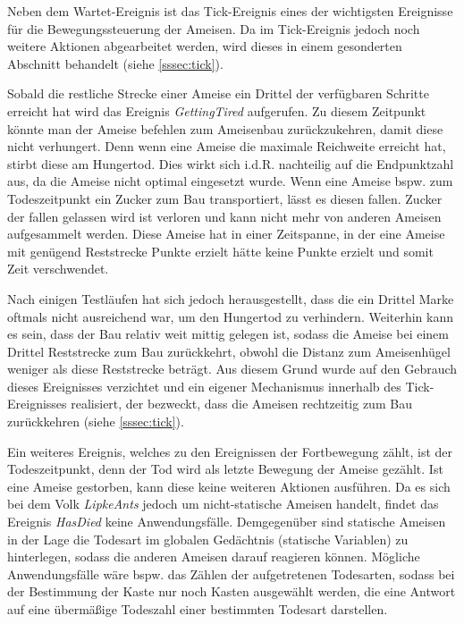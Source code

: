 
Neben dem Wartet-Ereignis ist das Tick-Ereignis eines der wichtigsten Ereignisse für die Bewegungssteuerung der Ameisen. Da im Tick-Ereignis jedoch noch weitere Aktionen abgearbeitet werden, wird dieses in einem gesonderten Abschnitt behandelt (siehe \ref{sssec:tick}).


Sobald die restliche Strecke einer Ameise ein Drittel der verfügbaren Schritte erreicht hat wird das Ereignis \textit{GettingTired} aufgerufen. Zu diesem Zeitpunkt könnte man der Ameise befehlen zum Ameisenbau zurückzukehren, damit diese nicht verhungert. Denn wenn eine Ameise die maximale Reichweite erreicht hat, stirbt diese am Hungertod. Dies wirkt sich i.d.R. nachteilig auf die Endpunktzahl aus, da die Ameise nicht optimal eingesetzt wurde. Wenn eine Ameise bspw. zum Todeszeitpunkt ein Zucker zum Bau transportiert, lässt es diesen fallen. Zucker der fallen gelassen wird ist verloren und kann nicht mehr von anderen Ameisen aufgesammelt werden. Diese Ameise hat in einer Zeitspanne, in der eine Ameise mit genügend Reststrecke Punkte erzielt hätte keine Punkte erzielt und somit Zeit verschwendet. 

Nach einigen Testläufen hat sich jedoch herausgestellt, dass die ein Drittel Marke oftmals nicht ausreichend war, um den Hungertod zu verhindern. Weiterhin kann es sein, dass der Bau relativ weit mittig gelegen ist, sodass die Ameise bei einem Drittel Reststrecke zum Bau zurückkehrt, obwohl die Distanz zum Ameisenhügel weniger als diese Reststrecke beträgt. Aus diesem Grund wurde auf den Gebrauch dieses Ereignisses verzichtet und ein eigener Mechanismus innerhalb des Tick-Ereignisses realisiert, der bezweckt, dass die Ameisen rechtzeitig zum Bau zurückkehren (siehe \ref{sssec:tick}).


Ein weiteres Ereignis, welches zu den Ereignissen der Fortbewegung zählt, ist der Todeszeitpunkt, denn der Tod wird als letzte Bewegung der Ameise gezählt. Ist eine Ameise gestorben, kann diese keine weiteren Aktionen ausführen. Da es sich bei dem Volk \textit{LipkeAnts} jedoch um nicht-statische Ameisen handelt, findet das Ereignis \textit{HasDied} keine Anwendungsfälle. Demgegenüber sind statische Ameisen in der Lage die Todesart im globalen Gedächtnis (statische Variablen) zu hinterlegen, sodass die anderen Ameisen darauf reagieren können. Mögliche Anwendungsfälle wäre bspw. das Zählen der aufgetretenen Todesarten, sodass bei der Bestimmung der Kaste nur noch Kasten ausgewählt werden, die eine Antwort auf eine übermäßige Todeszahl einer bestimmten Todesart darstellen.


